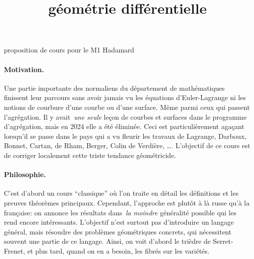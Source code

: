 


\newcommand{\1}{\mathbf{1}}
\newcommand{\R}{\mathbf{R}}
\newcommand{\T}{\mathbf{T}}
\newcommand{\Z}{\mathbf{Z}}
\newcommand{\ud}{\mathrm{d}}
\newcommand{\ds}{\displaystyle}

\newcommand{\abs}[1]{\left|#1\right|}
\newcommand{\Abs}[1]{\left\|#1\right\|}
\newcommand{\ABS}[1]{{\left\vert\kern-0.25ex\left\vert\kern-0.25ex\left\vert #1 \right\vert\kern-0.25ex\right\vert\kern-0.25ex\right\vert}}

\newcommand{\parens}[1]{\left(#1\right)} %
\newcommand{\pairing}[2]{\left\langle #1,\,#2\right\rangle} %




\title{géométrie différentielle}

\begin{center}
proposition de cours pour le M1 Hadamard
\end{center}

\paragraph{Motivation.}
Une partie importante des normaliens du département de mathématiques
finissent leur parcours sans avoir jamais vu les équations d'Euler-Lagrange
ni les notions de courbure d'une courbe ou d'une surface.  Même parmi ceux
qui passent l'agrégation.  Il y avait~\emph{une seule} leçon de courbes et
surfaces dans le programme d'agrégation, mais en 2024 elle a été éliminée.
Ceci est particulièrement agaçant lorsqu'il se passe dans le pays qui a vu
fleurir les travaux de Lagrange, Darboux, Bonnet, Cartan, de Rham, Berger,
Colin de Verdière, \ldots.  L'objectif de ce cours est de corriger localement
cette triste tendance géométricide.

\paragraph{Philosophie.}
C'est d'abord un cours ``classique'' où l'on traite en détail les définitions
et les preuves théorèmes principaux.  Cependant, l'approche est plutôt à là
russe qu'à la française: on annonce les résultats dans~\emph{la moindre}
généralité possible qui les rend encore intéressants.  L'objectif n'est
surtout pas d'introduire un langage général, mais résoudre des problèmes
géométriques concrets, qui nécessitent souvent une partie de ce langage.
Ainsi, on voit d'abord le trièdre de Serret-Frenet, et plus tard, quand on en
a besoin, les fibrés sur les variétés.

